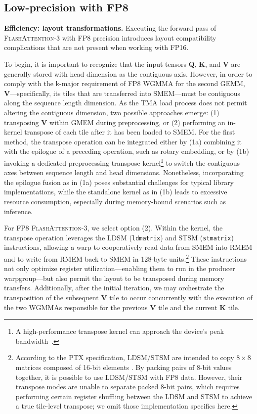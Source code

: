 \subsection{Low-precision with FP8}
\label{sec:algofp8}

\textbf{Efficiency: layout transformations.} Executing the forward pass of \textsc{FlashAttention-3} with FP8 precision introduces layout compatibility complications that are not present when working with FP16.

To begin, it is important to recognize that the input tensors $\mathbf{Q}$, $\mathbf{K}$, and $\mathbf{V}$ are generally stored with head dimension as the contiguous axis. However, in order to comply with the k-major requirement of FP8 WGMMA for the second GEMM, $\mathbf{V}$—specifically, its tiles that are transferred into SMEM—must be contiguous along the sequence length dimension. As the TMA load process does not permit altering the contiguous dimension, two possible approaches emerge: (1) transposing $\mathbf{V}$ within GMEM during preprocessing, or (2) performing an in-kernel transpose of each tile after it has been loaded to SMEM. For the first method, the transpose operation can be integrated either by (1a) combining it with the epilogue of a preceding operation, such as rotary embedding, or by (1b) invoking a dedicated preprocessing transpose kernel\footnote{A high-performance transpose kernel can approach the device’s peak bandwidth~\citep{colfax_cutlass_transpose_2024}.} to switch the contiguous axes between sequence length and head dimensions. Nonetheless, incorporating the epilogue fusion as in (1a) poses substantial challenges for typical library implementations, while the standalone kernel as in (1b) leads to excessive resource consumption, especially during memory-bound scenarios such as inference.

For FP8 \textsc{FlashAttention-3}, we select option (2). Within the kernel, the transpose operation leverages the LDSM (\verb|ldmatrix|) and STSM (\verb|stmatrix|) instructions, allowing a warp to cooperatively read data from SMEM into RMEM and to write from RMEM back to SMEM in 128-byte units.\footnote{According to the PTX specification, LDSM/STSM are intended to copy $8 \times 8$ matrices composed of 16-bit elements \cite[\S 9.7.13.4.15-16]{ptx}. By packing pairs of 8-bit values together, it is possible to use LDSM/STSM with FP8 data. However, their transpose modes are unable to separate packed 8-bit pairs, which requires performing certain register shuffling between the LDSM and STSM to achieve a true tile-level transpose; we omit those implementation specifics here.} These instructions not only optimize register utilization—enabling them to run in the producer warpgroup—but also permit the layout to be transposed during memory transfers. Additionally, after the initial iteration, we may orchestrate the transposition of the subsequent $\mathbf{V}$ tile to occur concurrently with the execution of the two WGMMAs responsible for the previous $\mathbf{V}$ tile and the current $\mathbf{K}$ tile.

